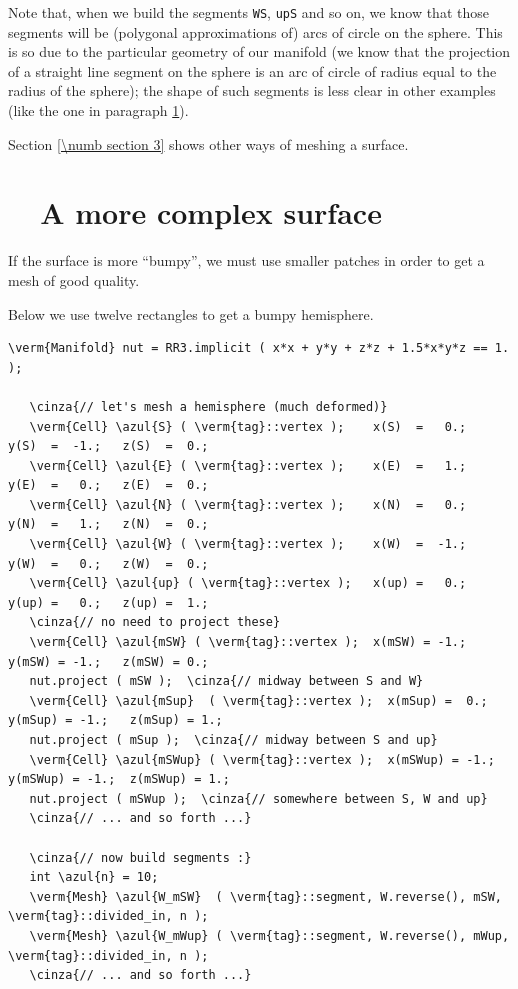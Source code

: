 Note that, when we build the segments {\small\tt WS}, {\small\tt upS} and so on,
we know that those segments will be (polygonal approximations of) arcs of circle on the sphere.
This is so due to the particular geometry of our manifold (we know that the projection of
a straight line segment on the sphere is an arc of circle of radius equal to the radius of
the sphere); the shape of such segments is less clear in other examples
(like the one in paragraph \ref{\numb section 2.\numb parag 7}).

Section \ref{\numb section 3} shows other ways of meshing a surface.


\section{~~A more complex surface}\label{\numb section 2.\numb parag 7}

If the surface is more ``bumpy'',
we must use smaller patches in order to get a mesh of good quality.

Below we use twelve rectangles to get a bumpy hemisphere.

\begin{Verbatim}[commandchars=\\\{\},formatcom=\small\tt,frame=single,
   label=parag-\ref{\numb section 2.\numb parag 7}.cpp,rulecolor=\color{coment},
   baselinestretch=0.94,framesep=2mm]
   \verm{Manifold} nut = RR3.implicit ( x*x + y*y + z*z + 1.5*x*y*z == 1. );

   \cinza{// let's mesh a hemisphere (much deformed)}
   \verm{Cell} \azul{S} ( \verm{tag}::vertex );    x(S)  =   0.;   y(S)  =  -1.;   z(S)  =  0.;
   \verm{Cell} \azul{E} ( \verm{tag}::vertex );    x(E)  =   1.;   y(E)  =   0.;   z(E)  =  0.;
   \verm{Cell} \azul{N} ( \verm{tag}::vertex );    x(N)  =   0.;   y(N)  =   1.;   z(N)  =  0.;
   \verm{Cell} \azul{W} ( \verm{tag}::vertex );    x(W)  =  -1.;   y(W)  =   0.;   z(W)  =  0.;
   \verm{Cell} \azul{up} ( \verm{tag}::vertex );   x(up) =   0.;   y(up) =   0.;   z(up) =  1.;
   \cinza{// no need to project these}
   \verm{Cell} \azul{mSW} ( \verm{tag}::vertex );  x(mSW) = -1.;   y(mSW) = -1.;   z(mSW) = 0.;
   nut.project ( mSW );  \cinza{// midway between S and W}
   \verm{Cell} \azul{mSup}  ( \verm{tag}::vertex );  x(mSup) =  0.;   y(mSup) = -1.;   z(mSup) = 1.;
   nut.project ( mSup );  \cinza{// midway between S and up}
   \verm{Cell} \azul{mSWup} ( \verm{tag}::vertex );  x(mSWup) = -1.;  y(mSWup) = -1.;  z(mSWup) = 1.;
   nut.project ( mSWup );  \cinza{// somewhere between S, W and up}
   \cinza{// ... and so forth ...}

   \cinza{// now build segments :}
   int \azul{n} = 10;
   \verm{Mesh} \azul{W_mSW}  ( \verm{tag}::segment, W.reverse(), mSW,  \verm{tag}::divided_in, n );
   \verm{Mesh} \azul{W_mWup} ( \verm{tag}::segment, W.reverse(), mWup, \verm{tag}::divided_in, n );
   \cinza{// ... and so forth ...}
\end{Verbatim}

